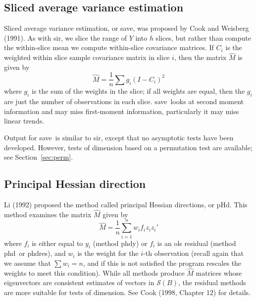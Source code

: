 \documentclass{article}
\newcommand{\sir}{{\sffamily sir}}
\newcommand{\save}{{\sffamily save}}
\newcommand{\phd}{{\sffamily phd}}
\newcommand{\phdy}{{\sffamily phdy}}
\newcommand{\phdq}{{\sffamily phdq}}
\newcommand{\phdres}{{\sffamily phdres}}
\renewcommand{\span}{{\mathcal S}}
\begin{document}
\subsection{Sliced average variance estimation}
Sliced average variance estimation, or \save, was proposed by Cook and
Weisberg (1991).  As with \sir, we slice the range of $Y$ into $h$ slices,
but rather than compute the within-slice mean we compute within-slice
covariance matrices.  If $C_i$ is the weighted within slice sample covariance
matrix in slice $i$,
then the matrix $\hat{M}$ is given by
\[
\hat{M} = \frac{1}{n}\sum g_i(I-C_i)^2
\]
where $g_i$ is the sum of the weights in the slice; if all weights are
equal, then the $g_i$ are just the number of observations in each slice.
\save\ looks at
second moment information and may miss first-moment information,
particularly it may miss linear trends.

Output for \save\ is similar to \sir, except that no asymptotic tests have
been developed.  However, tests of dimension based on a permutation test are
available; see Section~\ref{sec:perm}.

\subsection{Principal Hessian direction}
Li (1992) proposed the method called principal Hessian directions, or pHd.
This method examines the matrix $\hat{M}$ given by
\[
\hat{M} = \frac{1}{n}\sum_{i=1}^n w_i f_i z_iz_i'
\]
where $f_i$ is either equal to $y_i$ (method \phdy) or $f_i$ is an ols
residual (method \phd\ or \phdres), and $w_i$ is the weight for the $i$-th
observation (recall again that we assume that $\sum w_i = n$, and if this is
not satisfied the program rescales the weights to meet this condition).
While all methods produce $\hat{M}$
matrices whose eigenvectors are consistent estimates
of vectors in $\span(B)$, the
residual methods are more suitable for tests of dimension.  See Cook (1998,
Chapter 12) for details.
\end{document}
